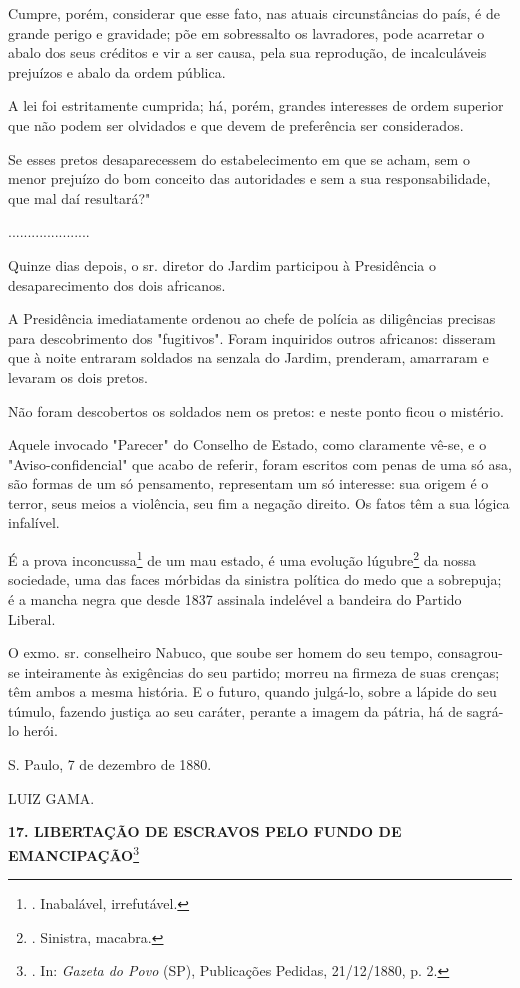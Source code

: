Cumpre, porém, considerar que esse fato, nas atuais circunstâncias do
país, é de grande perigo e gravidade; põe em sobressalto os lavradores,
pode acarretar o abalo dos seus créditos e vir a ser causa, pela sua
reprodução, de incalculáveis prejuízos e abalo da ordem pública.

A lei foi estritamente cumprida; há, porém, grandes interesses de ordem
superior que não podem ser olvidados e que devem de preferência ser
considerados.

Se esses pretos desaparecessem do estabelecimento em que se acham, sem o
menor prejuízo do bom conceito das autoridades e sem a sua
responsabilidade, que mal daí resultará?"

.....................

Quinze dias depois, o sr. diretor do Jardim participou à Presidência o
desaparecimento dos dois africanos.

A Presidência imediatamente ordenou ao chefe de polícia as diligências
precisas para descobrimento dos "fugitivos". Foram inquiridos outros
africanos: disseram que à noite entraram soldados na senzala do Jardim,
prenderam, amarraram e levaram os dois pretos.

Não foram descobertos os soldados nem os pretos: e neste ponto ficou o
mistério.

Aquele invocado "Parecer" do Conselho de Estado, como claramente vê-se,
e o "Aviso-confidencial" que acabo de referir, foram escritos com penas
de uma só asa, são formas de um só pensamento, representam um só
interesse: sua origem é o terror, seus meios a violência, seu fim a
negação direito. Os fatos têm a sua lógica infalível.

É a prova inconcussa\footnote{. Inabalável, irrefutável.} de um mau
estado, é uma evolução lúgubre\footnote{. Sinistra, macabra.}
da nossa sociedade, uma das
faces mórbidas da sinistra política do medo que a sobrepuja; é a mancha
negra que desde 1837 assinala indelével a bandeira do Partido Liberal.

O exmo. sr. conselheiro Nabuco, que soube ser homem do seu tempo,
consagrou-se inteiramente às exigências do seu partido; morreu na
firmeza de suas crenças; têm ambos a mesma história. E o futuro, quando
julgá-lo, sobre a lápide do seu túmulo, fazendo justiça ao seu caráter,
perante a imagem da pátria, há de sagrá-lo herói.

S. Paulo, 7 de dezembro de 1880.

LUIZ GAMA.

\textbf{17. LIBERTAÇÃO DE ESCRAVOS PELO FUNDO DE EMANCIPAÇÃO}\footnote{.
  In: \emph{Gazeta do Povo} (SP), Publicações Pedidas, 21/12/1880, p. 2.}

